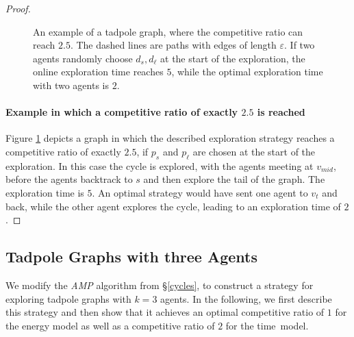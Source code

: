 \begin{proof}
\begin{figure}[H]
    \begin{center}
    \end{center}
    \caption[Tadpole example]{An example of a tadpole graph, where the competitive ratio can reach $2.5$. The dashed lines are paths with edges of length $\varepsilon$.
     If two agents randomly choose $d_s, d_\ell$ at the start of the exploration, the online exploration time reaches $5$, while the optimal exploration time with two agents is $2$.}
    \label{Example_randomchoice}
\end{figure}

\paragraph*{Example in which a competitive ratio of exactly $2.5$ is reached}

Figure \ref{Example_randomchoice} depicts a graph in which the described exploration strategy reaches a competitive ratio of exactly $2.5$, if $p_s$ and $p_\ell$ are chosen at the
start of the exploration. In this case the cycle is explored, with the agents meeting at $v_{mid}$, before the agents backtrack to $s$ and then explore the tail of the graph. The exploration time 
is $5$. An optimal strategy would have sent one agent to $v_t$ and back, while the other agent explores the cycle, leading to an exploration time of $2$.
\end{proof}

\subsection{Tadpole Graphs with three Agents}\label{tadpole_three}
We modify the \textit{AMP} algorithm from \S\ref{cycles}, to construct a strategy for exploring tadpole graphs with $k=3$ agents. 
In the following, we first describe this strategy and then show that it achieves an optimal competitive ratio of $1$ for the energy model
as well as a competitive ratio of $2$ for the time~model.


